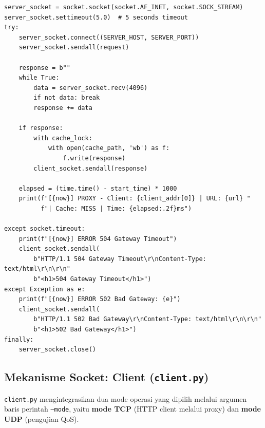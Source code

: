 \documentclass[11pt,a4paper]{article}
\begin{document}
\begin{lstlisting}[caption={Penanganan error 502 dan 504 pada \texttt{proxy.py}}, label={lst:proxy-error}]
server_socket = socket.socket(socket.AF_INET, socket.SOCK_STREAM)
server_socket.settimeout(5.0)  # 5 seconds timeout
try:
    server_socket.connect((SERVER_HOST, SERVER_PORT))
    server_socket.sendall(request)

    response = b""
    while True:
        data = server_socket.recv(4096)
        if not data: break
        response += data

    if response:
        with cache_lock:
            with open(cache_path, 'wb') as f:
                f.write(response)
        client_socket.sendall(response)

    elapsed = (time.time() - start_time) * 1000
    print(f"[{now}] PROXY - Client: {client_addr[0]} | URL: {url} "
          f"| Cache: MISS | Time: {elapsed:.2f}ms")

except socket.timeout:
    print(f"[{now}] ERROR 504 Gateway Timeout")
    client_socket.sendall(
        b"HTTP/1.1 504 Gateway Timeout\r\nContent-Type: text/html\r\n\r\n"
        b"<h1>504 Gateway Timeout</h1>")
except Exception as e:
    print(f"[{now}] ERROR 502 Bad Gateway: {e}")
    client_socket.sendall(
        b"HTTP/1.1 502 Bad Gateway\r\nContent-Type: text/html\r\n\r\n"
        b"<h1>502 Bad Gateway</h1>")
finally:
    server_socket.close()
\end{lstlisting}

\subsection{Mekanisme Socket: Client (\texttt{client.py})}

\texttt{client.py} mengintegrasikan dua mode operasi yang dipilih melalui argumen baris perintah \texttt{--mode}, yaitu \textbf{mode TCP} (HTTP client melalui proxy) dan \textbf{mode UDP} (pengujian QoS).
\end{document}
